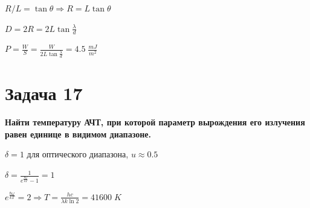 \documentclass[14pt,a4paper]{article}
\begin{document}
    $R/L = \tan{\theta} \Rightarrow R = L \tan{\theta}$

    $D = 2R = 2L \tan{\frac{\lambda}{d}}$

    $P = \frac{W}{S} = \frac{W}{2L \tan{\frac{\lambda}{d}}} = 4.5\; \frac{mJ}{m^2}$


\section*{Задача 17}
    
    \par \textbf{Найти температуру АЧТ, при которой параметр вырождения его излучения равен единице в видимом диапазоне.}\\
    
    \par

    $\delta = 1$  для оптического диапазона, $u \approx 0.5$

    $\delta = \frac{1}{e^{\frac{\hbar \omega}{kT}} - 1} = 1$

    $ e^{\frac{\hbar \omega}{kT}} = 2 \Rightarrow T = \frac{h c}{\lambda k \ln{2}} = 41600\; K$
\end{document}
